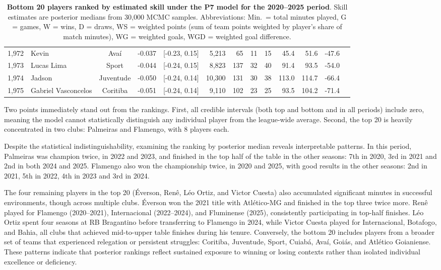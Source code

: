\begin{table}[htbp]
\begin{tabular}{rlcccrrrrrrrr}
        1,972 & Kevin & Avaí & -0.037 & [-0.23, 0.15] & 5,213 & 65 & 11 & 15 & 45.4 & 51.6 & -47.6 \\
        1,973 & Lucas Lima & Sport & -0.044 & [-0.24, 0.15] & 8,823 & 137 & 32 & 40 & 91.4 & 93.5 & -54.0 \\
        1,974 & Jadson & Juventude & -0.050 & [-0.24, 0.14] & 10,300 & 131 & 30 & 38 & 113.0 & 114.7 & -66.4 \\
        1,975 & Gabriel Vasconcelos & Coritiba & -0.051 & [-0.24, 0.14] & 9,110 & 102 & 23 & 25 & 93.5 & 104.2 & -71.4 \\
        \bottomrule
    \end{tabular}
    \caption{
        \textbf{Bottom 20 players ranked by estimated skill under the P7 model for the 2020--2025 period}.
        Skill estimates are posterior medians from 30,000 MCMC samples.
        Abbreviations: Min.\ = total minutes played, G = games, W = wins, D = draws, WS = weighted points (sum of team points weighted by player's share of match minutes), WG = weighted goals, WGD = weighted goal difference.
    }
    \label{tab:bottom20_2020_2025}
\end{table}

Two points immediately stand out from the rankings.
First, all credible intervals (both top and bottom and in all periods) include zero, meaning the model cannot statistically distinguish any individual player from the league-wide average.
Second, the top 20 is heavily concentrated in two clubs: Palmeiras and Flamengo, with 8 players each.

Despite the statistical indistinguishability, examining the ranking by posterior median reveals interpretable patterns.
In this period, Palmeiras was champion twice, in 2022 and 2023, and finished in the top half of the table in the other seasons: 7th in 2020, 3rd in 2021 and 2nd in both 2024 and 2025.
Flamengo also won the championship twice, in 2020 and 2025, with good results in the other seasons: 2nd in 2021, 5th in 2022, 4th in 2023 and 3rd in 2024.

The four remaining players in the top 20 (Éverson, Renê, Léo Ortiz, and Victor Cuesta) also accumulated significant minutes in successful environments, though across multiple clubs.
Éverson won the 2021 title with Atlético-MG and finished in the top three twice more.
Renê played for Flamengo (2020--2021), Internacional (2022--2024), and Fluminense (2025), consistently participating in top-half finishes.
Léo Ortiz spent four seasons at RB Bragantino before transferring to Flamengo in 2024, while Victor Cuesta played for Internacional, Botafogo, and Bahia, all clubs that achieved mid-to-upper table finishes during his tenure.
Conversely, the bottom 20 includes players from a broader set of teams that experienced relegation or persistent struggles: Coritiba, Juventude, Sport, Cuiabá, Avaí, Goiás, and Atlético Goianiense.
These patterns indicate that posterior rankings reflect sustained exposure to winning or losing contexts rather than isolated individual excellence or deficiency.

